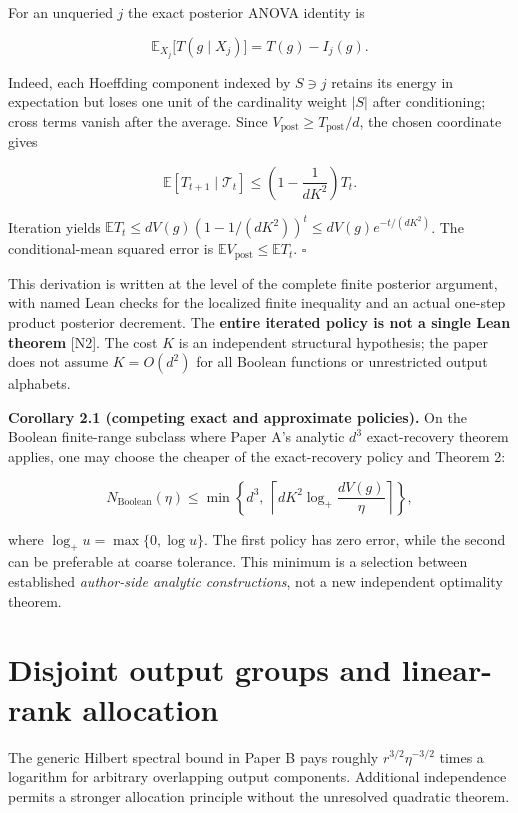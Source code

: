 \documentclass[
  10pt,
]{article}
\begin{document}
For an unqueried \(j\) the exact posterior ANOVA identity is

\[
\mathbb E_{X_j}\big[T(g\mid X_j)\big]=T(g)-I_j(g). \tag{11}
\]

Indeed, each Hoeffding component indexed by \(S\ni j\) retains its
energy in expectation but loses one unit of the cardinality weight
\(|S|\) after conditioning; cross terms vanish after the average. Since
\(V_{\mathrm{post}}\ge T_{\mathrm{post}}/d\), the chosen coordinate
gives

\[
\mathbb E[T_{t+1}\mid\mathcal T_t]\le
\left(1-\frac{1}{dK^2}\right)T_t.
\]

Iteration yields
\(\mathbb ET_t\le dV(g)(1-1/(dK^2))^t\le dV(g)e^{-t/(dK^2)}\). The
conditional-mean squared error is
\(\mathbb E V_{\mathrm{post}}\le\mathbb ET_t\). \(\square\)

This derivation is written at the level of the complete finite posterior
argument, with named Lean checks for the localized finite inequality and
an actual one-step product posterior decrement. The \textbf{entire
iterated policy is not a single Lean theorem} {[}N2{]}. The cost \(K\)
is an independent structural hypothesis; the paper does not assume
\(K=O(d^2)\) for all Boolean functions or unrestricted output alphabets.

\textbf{Corollary 2.1 (competing exact and approximate policies).} On
the Boolean finite-range subclass where Paper A's analytic \(d^3\)
exact-recovery theorem applies, one may choose the cheaper of the
exact-recovery policy and Theorem 2:

\[
N_{\mathrm{Boolean}}(\eta)\le
\min\left\{d^3,\ \left\lceil dK^2\log_+\!\frac{dV(g)}{\eta}\right\rceil\right\}, \tag{12}
\]

where \(\log_+u=\max\{0,\log u\}\). The first policy has zero error,
while the second can be preferable at coarse tolerance. This minimum is
a selection between established \emph{author-side analytic
constructions}, not a new independent optimality theorem.

\section{Disjoint output groups and linear-rank
allocation}\label{disjoint-output-groups-and-linear-rank-allocation}

The generic Hilbert spectral bound in Paper B pays roughly
\(r^{3/2}\eta^{-3/2}\) times a logarithm for arbitrary overlapping
output components. Additional independence permits a stronger allocation
principle without the unresolved quadratic theorem.
\end{document}
